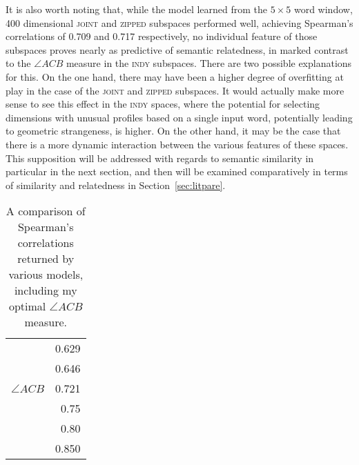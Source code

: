 It is also worth noting that, while the model learned from the $5 \times 5$ word window, 400 dimensional \textsc{joint} and \textsc{zipped} subspaces performed well, achieving Spearman's correlations of 0.709 and 0.717 respectively, no individual feature of those subspaces proves nearly as predictive of semantic relatedness, in marked contrast to the $\angle ACB$ measure in the \textsc{indy} subspaces.  There are two possible explanations for this.  On the one hand, there may have been a higher degree of overfitting at play in the case of the \textsc{joint} and \textsc{zipped} subspaces.  It would actually make more sense to see this effect in the \textsc{indy} spaces, where the potential for selecting dimensions with unusual profiles based on a single input word, potentially leading to geometric strangeness, is higher.  On the other hand, it may be the case that there is a more dynamic interaction between the various features of these spaces.  This supposition will be addressed with regards to semantic similarity in particular in the next section, and then will be examined comparatively in terms of similarity and relatedness in Section~\ref{sec:litpare}.

\begin{table}
\centering
\begin{tabular}{lr}
\hline
\cite{HassanEA2011} & 0.629 \\
\cite{LuongEA2013} & 0.646 \\
$\angle ACB$ & 0.721 \\
\cite{GabrilovichEA2007} & 0.75 \\
\cite{RadinskyEA2011} & 0.80 \\
\cite{HalawiEA2012} & 0.850 \\
\hline
\end{tabular}
\caption[Comparison of Relatedness Scores]{A comparison of Spearman's correlations returned by various models, including my optimal $\angle ACB$ measure.}
\label{tab:relpare}
\end{table}

